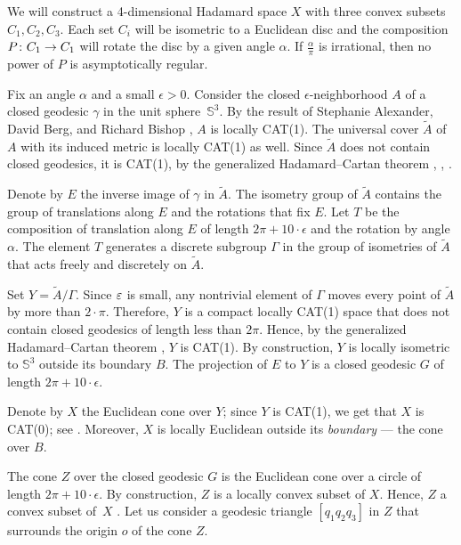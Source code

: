 \documentclass[a4paper,10pt]{article}
\begin{document}
We will construct a 4-dimensional Hadamard space $X$ with three convex subsets $C_1,C_2,C_3$.
Each set $C_i$ will be isometric to a Euclidean disc and the composition $P\:C_1\z\to C_1$ will rotate the disc by a given angle $\alpha$.
If  $\frac \alpha \pi$ is irrational, then no power of $P$ is asymptotically regular.

Fix an angle $\alpha$ and a small $\epsilon>0$.
Consider the closed 
$\epsilon$-neighborhood $A$ of a closed geodesic $\gamma$ in the unit sphere~$\mathbb{S}^3$.
By the result of Stephanie Alexander,  David Berg, and Richard Bishop \cite {ABB-1993}, $A$ is locally CAT(1).
The universal cover $\tilde A$ of $A$ with its induced metric is locally CAT(1) as well. 
Since $\tilde A$ does not contain closed geodesics, it is CAT(1), by  the generalized Hadamard--Cartan theorem
\cite[8.13.3]{AKP}, \cite[6.8+6.9]{ballmannnotes}, \cite{bowditch}.

Denote by $E$ the inverse image of $\gamma$ in $\tilde A$.
The isometry group of $\tilde A$ 
contains the group of translations along $E$ and 
the rotations that fix $E$.
Let $T$  be the composition of translation along $E$  of length $2\pi +10\cdot\epsilon$ and the rotation by angle $\alpha$.
The element $T$ generates a discrete subgroup $\Gamma$ in the group of isometries  of $\tilde A$ that acts freely and discretely on $\tilde A$.

Set $Y =\tilde A/\Gamma$.
Since $\varepsilon$ is small, any nontrivial element of $\Gamma$ moves
every point of $\tilde A$ by more than $2\cdot\pi$.
Therefore, $Y$ is a compact locally CAT(1) space that does not contain closed geodesics of length less than $2\pi$.
Hence, by  the generalized Hadamard--Cartan theorem \cite{AKP}, $Y$ is CAT(1).
By construction, $Y$ is locally isometric to $\mathbb{S}^3$ outside its boundary $B$.
The projection of $E$ to $Y$ is a closed geodesic $G$ of length $2\pi +10\cdot\epsilon$.

Denote by $X$ the Euclidean cone over $Y$;
since $Y$ is CAT(1), we get that $X$ is CAT(0); see \cite{AKP}.
Moreover, $X$ is locally Euclidean outside its \emph{boundary} --- the cone over $B$.

The cone $Z$ over the closed geodesic $G$ is  the Euclidean cone over a circle of length $2\pi +10\cdot\epsilon$.
By construction, $Z$ is a locally convex subset of $X$.
Hence, $Z$ a convex subset of~$X$ \cite[2.2.12]{AKP_inv}.
Let us consider a geodesic triangle
$[q_1q_2q_3]$
in $Z$ that surrounds the origin $o$ of the cone $Z$.
\end{document}
